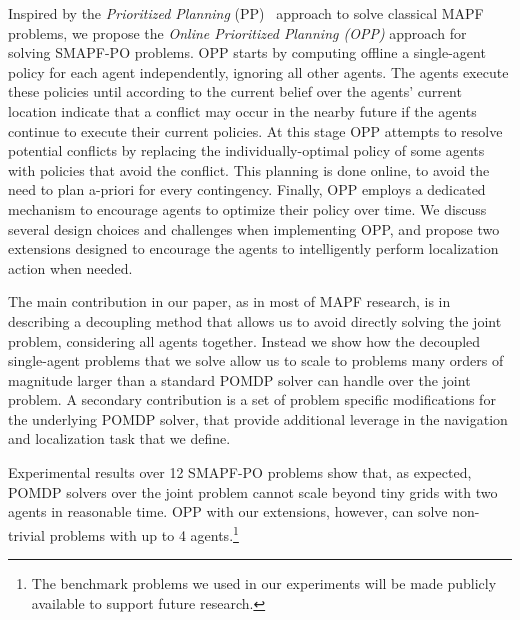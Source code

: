 \documentclass[letterpaper]{article} %
\begin{document}

Inspired by the \emph{Prioritized Planning} (PP)~\cite{silver2005cooperative} approach to solve classical MAPF problems, 
we propose the \emph{Online Prioritized Planning (OPP)} approach for solving SMAPF-PO problems. 
OPP starts by computing offline a single-agent policy for each agent independently, ignoring all other agents. 
The agents execute these policies until according to the current belief over the agents' current location indicate that a conflict may occur in the nearby future if the agents continue to execute their current policies. 
At this stage OPP attempts to resolve potential conflicts by replacing the individually-optimal policy of some agents with policies that avoid the conflict. This planning is done online, to avoid the need to plan a-priori for every contingency. Finally, OPP employs a dedicated mechanism to encourage agents to optimize their policy over time. 
We discuss several design choices and challenges when implementing OPP, and propose two extensions designed to encourage the agents to intelligently perform localization action when needed.  

The main contribution in our paper, as in most of MAPF research, is in describing a decoupling method that allows us to avoid directly solving the joint problem, considering all agents together. Instead we show how the decoupled single-agent problems that we solve allow us to scale to problems many orders of magnitude larger than a standard POMDP solver can handle over the joint problem. A secondary contribution is a set of problem specific modifications for the underlying POMDP solver, that provide additional leverage in the navigation and localization task that we define.

Experimental results over 12 SMAPF-PO problems show that, as expected, POMDP solvers over the joint problem cannot scale beyond tiny grids with two agents in reasonable time. OPP with our extensions, however, can solve non-trivial problems with up to 4 agents.\footnote{The benchmark problems we used in our experiments will be made publicly available to support future research.}
\end{document}
